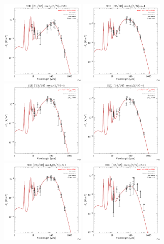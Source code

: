 \documentclass[preprint2,longabstract]{aastex}
\begin{document}
\begin{figure}
\centering
    \includegraphics[trim=0 2mm 0 0, clip, width=40mm]{../SEDs/sed_21.pdf}
	\includegraphics[trim=0 2mm 0 0, clip, width=40mm]{../SEDs/sed_22.pdf}
	\includegraphics[trim=0 2mm 0 0, clip, width=40mm]{../SEDs/sed_23.pdf}
	\includegraphics[trim=0 2mm 0 0, clip, width=40mm]{../SEDs/sed_24.pdf}
	\includegraphics[trim=0 2mm 0 0, clip, width=40mm]{../SEDs/sed_25.pdf}
	\includegraphics[trim=0 2mm 0 0, clip, width=40mm]{../SEDs/sed_26.pdf}

\end{figure}
\end{document}
